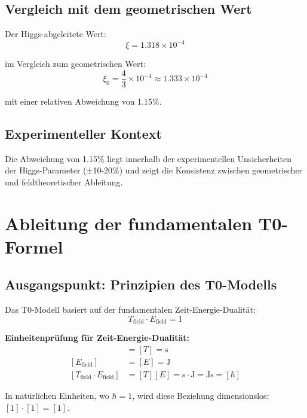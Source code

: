 \documentclass[12pt,a4paper]{article}
\theoremstyle{definition}
\begin{document}
	\subsection{Vergleich mit dem geometrischen Wert}
	Der Higgs-abgeleitete Wert:
	\begin{equation}
		\xi = 1.318 \times 10^{-4}
	\end{equation}
	
	im Vergleich zum geometrischen Wert:
	\begin{equation}
		\xi_0 = \frac{4}{3} \times 10^{-4} \approx 1.333 \times 10^{-4}
	\end{equation}
	
	mit einer relativen Abweichung von 1.15\%.
	
	\subsection{Experimenteller Kontext}
	Die Abweichung von 1.15\% liegt innerhalb der experimentellen Unsicherheiten der Higgs-Parameter (±10-20\%) und zeigt die Konsistenz zwischen geometrischer und feldtheoretischer Ableitung.
	
	\section{Ableitung der fundamentalen T0-Formel}
	
	\subsection{Ausgangspunkt: Prinzipien des T0-Modells}
	
	Das T0-Modell basiert auf der fundamentalen Zeit-Energie-Dualität:
	\begin{equation}
		T_{\text{field}} \cdot E_{\text{field}} = 1
	\end{equation}
	
	\textbf{Einheitenprüfung für Zeit-Energie-Dualität:}
	\begin{align}
		[T_{\text{field}}] &= [T] = \si{\second} \\
		[E_{\text{field}}] &= [E] = \si{\joule} \\
		[T_{\text{field}} \cdot E_{\text{field}}] &= [T][E] = \si{\second} \cdot \si{\joule} = \si{\joule\second} = [\hbar]
	\end{align}
	
	In natürlichen Einheiten, wo $\hbar = 1$, wird diese Beziehung dimensionslos: $[1] \cdot [1] = [1]$.
	
\end{document}
